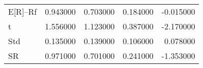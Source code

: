 \begin{tabular}{lrrrr}
\toprule
\midrule
E[R]--Rf & 0.943000 & 0.703000 & 0.184000 & -0.015000 \\
t & 1.556000 & 1.123000 & 0.387000 & -2.170000 \\
Std & 0.135000 & 0.139000 & 0.106000 & 0.078000 \\
SR & 0.971000 & 0.701000 & 0.241000 & -1.353000 \\
\bottomrule
\end{tabular}
